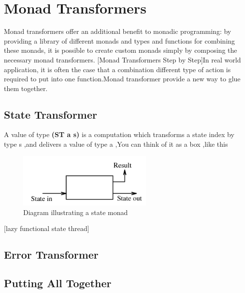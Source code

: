 \chapter{Monad Transformers}

Monad transformers offer an additional benefit to monadic programming: by providing a
library of different monads and types and functions for combining these monads, it is possible
to create custom monads simply by composing the necessary monad transformers. [Monad Transformers Step by Step]In real world application, it is often the case that a combination different type of action is required to put into one function.Monad transformer provide a new way to glue them together.

\section{State Transformer}
A value of type \textbf{(ST a s)} is a computation which transforms a state index by type s ,and delivers a value of type a ,You can think of it as a box ,like this 

\begin{figure}[H]
  \centering
	\includegraphics[width=0.60\textwidth]{pic/c3/state.png}
	\caption{Diagram illustrating a state monad}
\end{figure}
[lazy functional state thread]


\section{Error Transformer}


\section{Putting All Together}